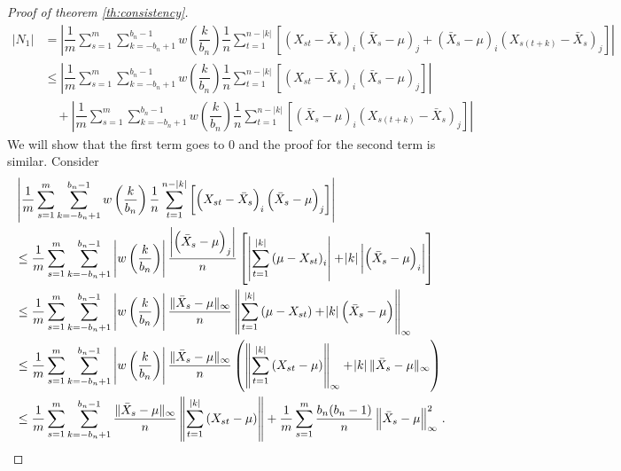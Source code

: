\documentclass[11pt]{article}
\theoremstyle{remark}
\begin{document}
\begin{proof}[Proof of theorem \ref{th:consistency}]
%
\begin{align*}
|N_1| & = \left|\dfrac{1}{m}\sum_{s=1}^{m}  \sum_{k=-b_n+1}^{b_n-1}  w\left(\dfrac{k}{b_n}\right)\dfrac{1}{n}  \sum_{t=1}^{n-|k|}  \left[ \left(X_{st} - \bar{X}_s \right)_i  \left(\bar{X}_s - \mu \right)_j + \left(\bar{X}_s - \mu \right)_i  \left(X_{s(t+k)} - \bar{X}_s \right)_j\right] \right|\\
& \leq \left| \dfrac{1}{m}\sum_{s=1}^{m}\sum_{k=-b_n+1}^{b_n-1}w\left(\dfrac{k}{b_n}\right)\dfrac{1}{n}\sum_{t=1}^{n-|k|}\left[ \left(X_{st} - \bar{X}_s \right)_i  \left(\bar{X}_s - \mu \right)_j \right] \right| \\ 
& \quad + \left| \dfrac{1}{m}\sum_{s=1}^{m}\sum_{k=-b_n+1}^{b_n-1}w\left(\dfrac{k}{b_n}\right)\dfrac{1}{n}\sum_{t=1}^{n-|k|}\left[ \left(\bar{X}_s - \mu \right)_i  \left(X_{s(t+k)} - \bar{X}_s \right)_j\right] \right|
\end{align*}
%
We will show that the first term goes to 0 and the proof for the second term is similar. Consider
\begin{align*}
    & \left| \dfrac{1}{m}\sum_{s=1}^{m}\sum_{k=-b_n+1}^{b_n-1}w\left(\dfrac{k}{b_n}\right)\dfrac{1}{n}\sum_{t=1}^{n-|k|}\left[ \left(X_{st} - \bar{X}_s \right)_i  \left(\bar{X}_s - \mu \right)_j \right] \right| \\
    & \leq \dfrac{1}{m}\sum_{s=1}^{m}\sum_{k=-b_n+1}^{b_n-1} \left| w\left(\dfrac{k}{b_n}\right) \right| \dfrac{ \left|  \left(\bar{X}_s - \mu \right)_j \right| }{n} \left[ \left|\sum_{t=1}^{|k|} \left(\mu - X_{st} \right)_i \right| + \abs{k} \left|\left(\bar{X}_s - \mu \right)_i \right|\right]\\
    & \leq \dfrac{1}{m}\sum_{s=1}^{m}\sum_{k=-b_n+1}^{b_n-1}  \left|w\left(\dfrac{k}{b_n}\right) \right|\dfrac{\|\bar{X}_s - \mu\|_{\infty}}{n} \left\|\sum_{t=1}^{|k|} \left(\mu - X_{st} \right) + \abs{k} \left(\bar{X}_s - \mu \right)\right\|_{\infty}\\
    & \leq \dfrac{1}{m}\sum_{s=1}^{m}\sum_{k=-b_n+1}^{b_n-1} \left|w\left(\dfrac{k}{b_n}\right) \right|\dfrac{\|\bar{X}_s - \mu\|_{\infty}}{n} \left(\left\|\sum_{t=1}^{|k|}  \left(X_{st} - \mu \right)\right\|_{\infty} + \abs{k}\|\bar{X}_s - \mu\|_{\infty} \right)\\
    & \leq \dfrac{1}{m}\sum_{s=1}^{m}\sum_{k=-b_n+1}^{b_n-1}\dfrac{\|\bar{X}_s - \mu\|_{\infty}}{n} \left\|\sum_{t=1}^{|k|} \left(X_{st} - \mu\right) \right\| + \dfrac{1}{m}\sum\limits_{s=1}^{m} \dfrac{b_n(b_n-1)}{n} \left \|\bar{X}_s - \mu \right \|_{\infty}^2\,.
\end{align*}


\end{proof}
\end{document}
